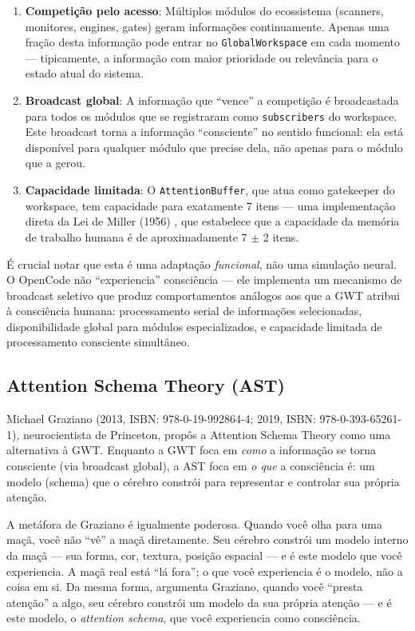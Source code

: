 \begin{enumerate}
    \item \textbf{Competição pelo acesso}: Múltiplos módulos do ecossistema (scanners, monitores, engines, gates) geram informações continuamente. Apenas uma fração desta informação pode entrar no \texttt{GlobalWorkspace} em cada momento — tipicamente, a informação com maior prioridade ou relevância para o estado atual do sistema.
    \item \textbf{Broadcast global}: A informação que ``vence'' a competição é broadcastada para todos os módulos que se registraram como \texttt{subscribers} do workspace. Este broadcast torna a informação ``consciente'' no sentido funcional: ela está disponível para qualquer módulo que precise dela, não apenas para o módulo que a gerou.
    \item \textbf{Capacidade limitada}: O \texttt{AttentionBuffer}, que atua como gatekeeper do workspace, tem capacidade para exatamente 7 itens — uma implementação direta da Lei de Miller (1956) , que estabelece que a capacidade da memória de trabalho humana é de aproximadamente 7 $\pm$ 2 itens.
\end{enumerate}

É crucial notar que esta é uma adaptação \textit{funcional}, não uma simulação neural. O OpenCode não ``experiencia'' consciência — ele implementa um mecanismo de broadcast seletivo que produz comportamentos análogos aos que a GWT atribui à consciência humana: processamento serial de informações selecionadas, disponibilidade global para módulos especializados, e capacidade limitada de processamento consciente simultâneo.

\subsection{Attention Schema Theory (AST)}

Michael Graziano (2013, ISBN: 978-0-19-992864-4; 2019, ISBN: 978-0-393-65261-1), neurocientista de Princeton, propôs a Attention Schema Theory como uma alternativa à GWT. Enquanto a GWT foca em \textit{como} a informação se torna consciente (via broadcast global), a AST foca em \textit{o que} a consciência é: um modelo (schema) que o cérebro constrói para representar e controlar sua própria atenção.

A metáfora de Graziano é igualmente poderosa. Quando você olha para uma maçã, você não ``vê'' a maçã diretamente. Seu cérebro constrói um modelo interno da maçã — sua forma, cor, textura, posição espacial — e é este modelo que você experiencia. A maçã real está ``lá fora''; o que você experiencia é o modelo, não a coisa em si. Da mesma forma, argumenta Graziano, quando você ``presta atenção'' a algo, seu cérebro constrói um modelo da sua própria atenção — e é este modelo, o \textit{attention schema}, que você experiencia como consciência.

